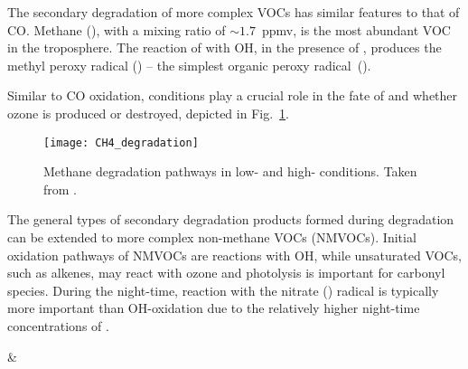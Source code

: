 The secondary degradation of more complex VOCs has similar features to that of CO.
Methane (), with a mixing ratio of ${\sim}1.7$~ppmv, is the most abundant VOC in the troposphere.
The reaction of  with OH, in the presence of , produces the methyl peroxy radical () -- the simplest organic peroxy radical~().
\begin{rxnarray}
       \label{r:CH4_OH}
\end{rxnarray}
Similar to CO oxidation,  conditions play a crucial role in the fate of  and whether ozone is produced or destroyed, depicted in Fig.~\ref{f:CH4_oxidation}.

\begin{figure}[t]%
    \begin{center}%
        \caption[Methane degradation pathways]{Methane degradation pathways in low- and high- conditions. Taken from \citet{Monks:2005}.}%
        \vspace{3mm}
        \texttt{[image: CH4\_degradation]}%
        \label{f:CH4_oxidation}%
    \end{center}%
\end{figure}%

The general types of secondary degradation products formed during  degradation can be extended to more complex non-methane VOCs (NMVOCs).
Initial oxidation pathways of NMVOCs are reactions with OH, while unsaturated VOCs, such as alkenes, may react with ozone and photolysis is important for carbonyl species.
During the night-time, reaction with the nitrate () radical is typically more important than OH-oxidation due to the relatively higher night-time concentrations of .
\begin{rxnarray}
     &   \label{r:VOC_init} 
\end{rxnarray} 

